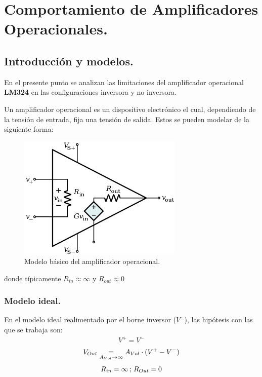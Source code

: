 
\section{Comportamiento de Amplificadores Operacionales.}

\subsection{Introducción y modelos.}
En el presente punto se analizan las limitaciones del amplificador operacional \textbf{LM324} en las configuraciones inversora y no inversora.

Un amplificador operacional es un dispositivo electrónico el cual, dependiendo de la tensión de entrada, fija una tensión de salida. Estos se pueden modelar de la siguiente forma:
\begin{figure}[H]	
	\centering
	\includegraphics[width=0.7\textwidth]{Ejercicio1/Imagenes/Basicopamp.png}
	\caption{Modelo básico del amplificador operacional.}
	\label{fig:Basicopamp}
\end{figure}
donde típicamente $R_{in}\approx \infty$ y $R_{out} \approx 0$

\subsubsection{Modelo ideal.}
En el modelo ideal realimentado por el borne inversor ($V^-$), las hipótesis con las que se trabaja son:
\begin{align} V^+ = V^- \end{align}
\begin{align}V_{Out} \underrel{A_{Vol}\to \infty}{=} A_{Vol} \cdot (V^+ - V^-) \end{align}
\begin{align} R_{in}=\infty   \thinspace;\thinspace R_{Out} = 0 \end{align}


